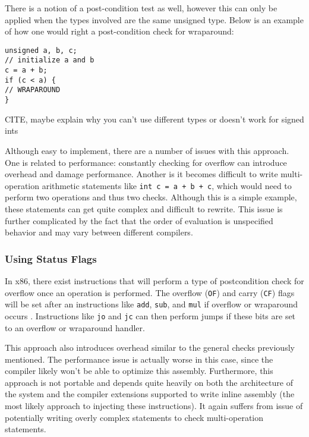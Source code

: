 There is a notion of a post-condition test as well, however this can only be applied when the types involved are the same unsigned type. Below is an example of how one would right a post-condition check for wraparound:

\begin{center}
\parbox{0.9\linewidth}{
\texttt{unsigned a, b, c;\\
// initialize a and b\\
c = a + b;\\
if (c < a) \{\\
\hspace*{1.5em}// WRAPAROUND\\
\}}
}
\end{center}
CITE, maybe explain why you can't use different types or doesn't work for signed ints

Although easy to implement, there are a number of issues with this approach. One is related to performance: constantly checking for overflow can introduce overhead and damage performance. Another is it becomes difficult to write multi-operation arithmetic statements like \texttt{int c = a + b + c}, which would need to perform two operations and thus two checks. Although this is a simple example, these statements can get quite complex and difficult to rewrite. This issue is further complicated by the fact that the order of evaluation is unspecified behavior and may vary between different compilers.

\subsubsection{Using Status Flags}

In x86, there exist instructions that will perform a type of postcondition check for overflow once an operation is performed. The overflow (\texttt{OF}) and carry (\texttt{CF}) flags will be set after an instructions like \texttt{add}, \texttt{sub}, and \texttt{mul} if overflow or wraparound occurs \cite{x86}. Instructions like \texttt{jo} and \texttt{jc} can then perform jumps if these bits are set to an overflow or wraparound handler.

This approach also introduces overhead similar to the general checks previously mentioned. The performance issue is actually worse in this case, since the compiler likely won't be able to optimize this assembly. Furthermore, this approach is not portable and depends quite heavily on both the architecture of the system and the compiler extensions supported to write inline assembly (the most likely approach to injecting these instructions). It again suffers from issue of potentially writing overly complex statements to check multi-operation statements.

